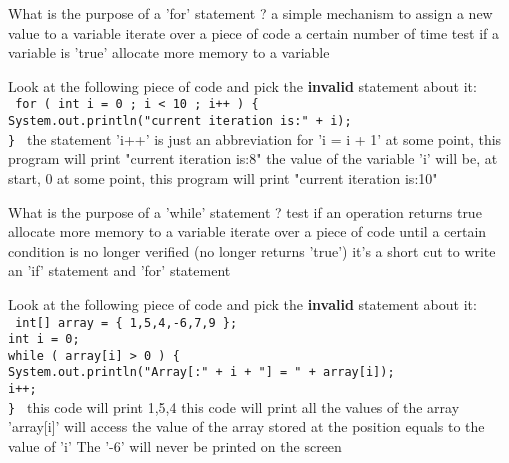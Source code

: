 \begin{question}{
What is the purpose of a 'for' statement ?
}
  \false a simple mechanism to assign a new value to a variable
  \true iterate over a piece of code a certain number of time
  \false test if a variable is 'true'
  \false allocate more memory to a variable
\end{question}

\begin{question}{
Look at the following piece of code and pick the \textbf{invalid} statement about it:\\
\small{
  \texttt{
    for ( int i = 0 ; i < 10 ; i++ ) \{ \\
      \vspace{4pt} System.out.println("current iteration is:" + i); \\
    \}
  }
}
}
  \false the statement 'i++' is just an abbreviation for 'i = i + 1'
  \false at some point, this program will print "current iteration is:8"
  \false the value of the variable 'i' will be, at start, 0
  \true at some point, this program will print "current iteration is:10"
\end{question}

\begin{question}{
What is the purpose of a 'while' statement ?
}
  \false test if an operation returns true
  \false allocate more memory to a variable
  \true iterate over a piece of code until a certain condition is no longer verified (no longer
  returns 'true')
  \false it's a short cut to write an 'if' statement and 'for' statement
\end{question}

\begin{question}{
Look at the following piece of code and pick the \textbf{invalid} statement about it:\\
\small{
\texttt{
    int[] array = \{ 1,5,4,-6,7,9 \}; \\
    int i = 0; \\
    while ( array[i] > 0 ) \{ \\
      \vspace{4pt} System.out.println("Array[:" + i + "] = " + array[i]); \\
      \vspace{4pt} i++; \\
    \}
}
}
}
  \false this code will print 1,5,4
  \true this code will print all the values of the array
  \false 'array[i]' will access the value of the array stored at the position equals to the value of 'i'
  \false The '-6' will never be printed on the screen
\end{question}

